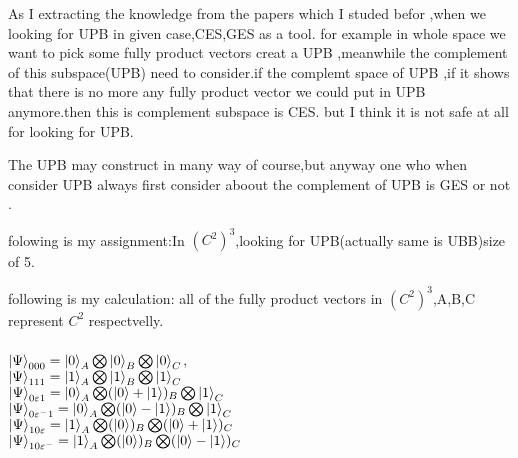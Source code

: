\documentclass[a4paper,12pt]{article}
\begin{document}
As I extracting the knowledge  from the papers which I studed befor ,when we looking for UPB in given case,CES,GES  as a tool.  
for example in whole space we want to pick some fully product vectors creat a UPB ,meanwhile the complement of this subspace(UPB) need to consider.if the complemt space of UPB ,if it shows that there is no more any fully product vector we could put in UPB anymore.then this is complement subspace is CES.
but I think it is not safe at all for looking for UPB.

%


%
%



The UPB may construct in many way of course,but anyway one who when consider UPB always first consider aboout the complement of UPB is GES or not .

folowing is my assignment:In $(C^2)^3$,looking for UPB(actually same is UBB)size of 5.


following is my calculation:
all of the fully product vectors in $(C^2)^3$,A,B,C represent $C^2$ respectvelly.
\paragraph{}
$ \ket{\Psi}_{000} =\ket{0}_{A}\bigotimes \ket{0}_{B}\bigotimes\ket{0}_{C}$,  
\newline \\

$ \ket{\Psi}_{111} =\ket{1}_{A}\bigotimes \ket{1}_{B}\bigotimes\ket{1}_{C}$
\newline \\

 $ \ket{\Psi}_{0\varepsilon1} =\ket{0}_{A}\bigotimes (\ket{0}+\ket{1})_{B}\bigotimes\ket{1}_{C}$
 \newline \\
 
 $ \ket{\Psi}_{0\varepsilon^{-}1} =\ket{0}_{A}\bigotimes (\ket{0}-\ket{1})_{B}\bigotimes\ket{1}_{C}$
 \newline \\
 
 $ \ket{\Psi}_{10\varepsilon} =\ket{1}_{A}\bigotimes (\ket{0})_{B}\bigotimes(\ket{0}+\ket{1})_{C}$
 \newline \\
 
 $ \ket{\Psi}_{10\varepsilon^{-}} =\ket{1}_{A}\bigotimes (\ket{0})_{B}\bigotimes(\ket{0}-\ket{1})_{C}$
 \newline \\
 
\end{document}
